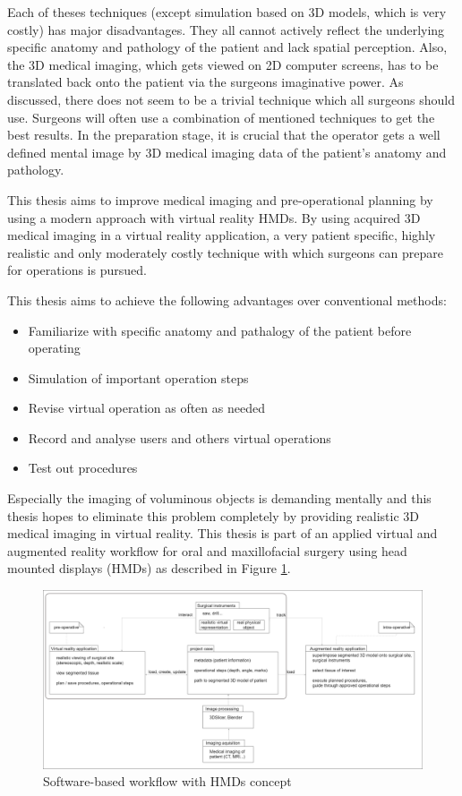 Each of theses techniques (except simulation based on 3D models, which is very costly) has major disadvantages.
They all cannot actively reflect the underlying specific anatomy and pathology of the patient and lack spatial perception.
Also, the 3D medical imaging, which gets viewed on 2D computer screens, has to be translated back onto the patient via the surgeons imaginative power. 
As discussed, there does not seem to be a trivial technique which all surgeons should use.
Surgeons will often use a combination of mentioned techniques to get the best results.
In the preparation stage, it is crucial that the operator gets a well defined mental image by 3D medical imaging data of the patient's anatomy and pathology.

This thesis aims to improve medical imaging and pre-operational planning by using a modern approach with virtual reality HMDs.
By using acquired 3D medical imaging in a virtual reality application, a very patient specific, highly realistic and only moderately costly technique with which surgeons can prepare for operations is pursued.

This thesis aims to achieve the following advantages over conventional methods:

\begin{itemize}
    \item Familiarize with specific anatomy and pathalogy of the patient before operating
    \item Simulation of important operation steps
    \item Revise virtual operation as often as needed
    \item Record and analyse users and others virtual operations
    \item Test out procedures
\end{itemize}

Especially the imaging of voluminous objects is demanding mentally and this thesis hopes to eliminate this problem completely by providing realistic 3D medical imaging in virtual reality.
This thesis is part of an applied virtual and augmented reality workflow for oral and maxillofacial surgery using head mounted displays (HMDs) as described in Figure \ref{fig::ProjectPlan}.

\begin{figure}[ht!]
    \centering
    \includegraphics[width=\linewidth]{images/project_plan.png}
    \caption{\label{fig::ProjectPlan} Software-based workflow with HMDs concept}
\end{figure}

